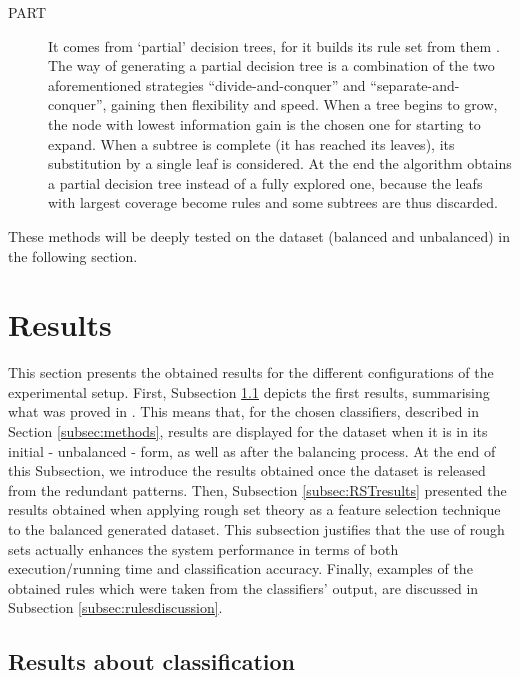 \documentclass{llncs}
\begin{document}
\begin{description}
 \item[PART] It comes from `partial' decision trees, for it builds its rule set from them \cite{Frank1998}. The way of generating a partial decision tree is a combination of the two aforementioned strategies ``divide-and-conquer'' and ``separate-and-conquer'', gaining then flexibility and speed. When a tree begins to grow, the node with lowest information gain is the chosen one for starting to expand. When a subtree is complete (it has reached its leaves), its substitution by a single leaf is considered. At the end the algorithm obtains a partial decision tree instead of a fully explored one, because the leafs with largest coverage become rules and some subtrees are thus discarded.
 \end{description}

These methods will be deeply tested on the dataset (balanced and unbalanced) in the following section.

%
\section{Results}
\label{sec:results}

This section presents the obtained results for the different configurations of the experimental setup. First, Subsection \ref{subsec:firstresults} depicts the first results, summarising what was proved in \cite{ECTA}. This means that, for the chosen classifiers, described in Section \ref{subsec:methods}, results are displayed for the dataset when it is in its initial - unbalanced - form, as well as after the balancing process. At the end of this Subsection, we introduce the results obtained once the dataset is released from the redundant patterns. Then, Subsection \ref{subsec:RSTresults} presented the results obtained when applying rough set theory as a feature selection technique to the balanced generated dataset. This subsection justifies that the use of rough sets actually enhances the system performance in terms of  both execution/running time and classification accuracy. Finally, examples of the obtained rules which were taken from the classifiers' output, are discussed in Subsection \ref{subsec:rulesdiscussion}.

\subsection{Results about classification}
\label{subsec:firstresults}
\end{document}
